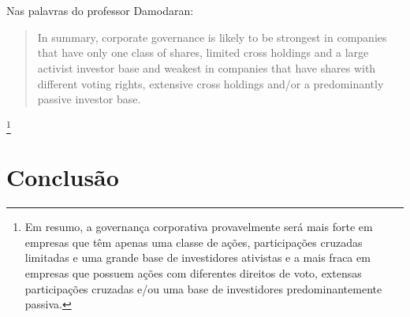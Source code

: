 \\~\\
Nas palavras do professor Damodaran:
\begin{quote}
In summary, corporate governance is likely to be strongest in companies that have only
one class of shares, limited cross holdings and a large activist investor base and weakest
in companies that have shares with different voting rights, extensive cross holdings
and/or a predominantly passive investor base.
\end{quote}\footnote{Em resumo, a governança corporativa provavelmente será mais forte em empresas que têm apenas
uma classe de ações, participações cruzadas limitadas e uma grande base de investidores ativistas e a mais fraca
em empresas que possuem ações com diferentes direitos de voto, extensas participações cruzadas
e/ou uma base de investidores predominantemente passiva.

}
\section{Conclusão}
